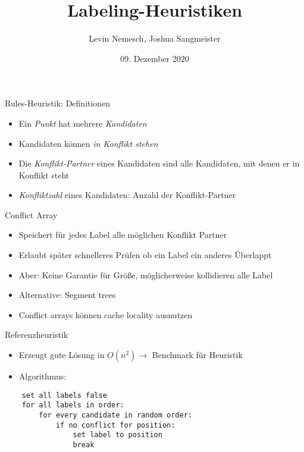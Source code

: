 \documentclass[ngerman,aspectratio=169,10pt]{beamer}
\title{Labeling-Heuristiken}
\date{09. Dezember 2020}
\author{Levin Nemesch, Joshua Sangmeister}
\institute{Algorithm Engineering - Projekt}
\begin{document}
\maketitle



\begin{frame}{Rules-Heuristik: Definitionen}
    \begin{itemize}
        \item Ein \textit{Punkt} hat mehrere \textit{Kandidaten}
        \item Kandidaten können \textit{in Konflikt stehen}
        \item Die \textit{Konflikt-Partner} eines Kandidaten sind alle Kandidaten, mit denen er in Konflikt steht
        \item \textit{Konfliktzahl} eines Kandidaten: Anzahl der Konflikt-Partner
    \end{itemize}
\end{frame}


\begin{frame}{Conflict Array}
    \begin{itemize}
        \item Speichert für jedes Label alle möglichen Konflikt Partner
        \item Erlaubt später schnelleres Prüfen ob ein Label ein anderes Überlappt
        \item Aber: Keine Garantie für Größe, möglicherweise kollidieren alle Label
        \item Alternative: Segment trees
        \item Conflict arrays können cache locality ausnutzen
    \end{itemize}
\end{frame}


\begin{frame}[fragile]{Referenzheuristik}
    \begin{itemize} 
        \item Erzeugt gute Lösung in $O(n^2) \longrightarrow$ Benchmark für Heuristik
        \item Algorithmus:
    \end{itemize}

    \begin{lstlisting}
    set all labels false 
    for all labels in order:
        for every candidate in random order:
            if no conflict for position:
                set label to position
                break
    \end{lstlisting}
\end{frame}
\end{document}
